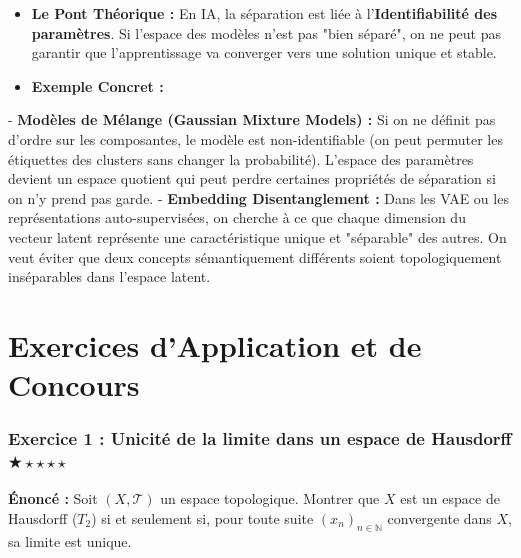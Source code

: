 \documentclass[11pt,a4paper]{article}
\begin{document}
\begin{itemize}
\item \textbf{Le Pont Théorique :} En IA, la séparation est liée à l'\textbf{Identifiabilité des paramètres}. Si l'espace des modèles n'est pas "bien séparé", on ne peut pas garantir que l'apprentissage va converger vers une solution unique et stable.

\item \textbf{Exemple Concret :}
\end{itemize}
    - \textbf{Modèles de Mélange (Gaussian Mixture Models) :} Si on ne définit pas d'ordre sur les composantes, le modèle est non-identifiable (on peut permuter les étiquettes des clusters sans changer la probabilité). L'espace des paramètres devient un espace quotient qui peut perdre certaines propriétés de séparation si on n'y prend pas garde.
    - \textbf{Embedding Disentanglement :} Dans les VAE ou les représentations auto-supervisées, on cherche à ce que chaque dimension du vecteur latent représente une caractéristique unique et "séparable" des autres. On veut éviter que deux concepts sémantiquement différents soient topologiquement inséparables dans l'espace latent.




\newpage
\part{Exercices d'Application et de Concours}


\section{Exercice 1 : Unicité de la limite dans un espace de Hausdorff \quad $\bigstar\star\star\star\star$}


\textbf{Énoncé :}
Soit $(X, \mathcal{T})$ un espace topologique. Montrer que $X$ est un espace de Hausdorff ($T_2$) si et seulement si, pour toute suite $(x_n)_{n \in \mathbb{N}}$ convergente dans $X$, sa limite est unique.
\end{document}
